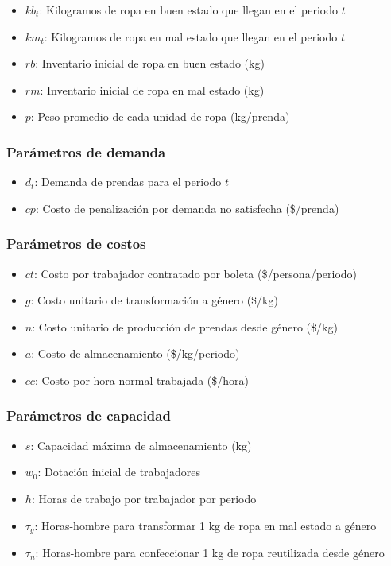 \begin{itemize}
    \item $kb_t$: Kilogramos de ropa en buen estado que llegan en el periodo $t$
    \item $km_t$: Kilogramos de ropa en mal estado que llegan en el periodo $t$
    \item $rb$: Inventario inicial de ropa en buen estado (kg)
    \item $rm$: Inventario inicial de ropa en mal estado (kg)
    \item $p$: Peso promedio de cada unidad de ropa (kg/prenda)
\end{itemize}

\subsubsection*{Parámetros de demanda}

\begin{itemize}
    \item $d_t$: Demanda de prendas para el periodo $t$
    \item $cp$: Costo de penalización por demanda no satisfecha (\$/prenda)
\end{itemize}

\subsubsection*{Parámetros de costos}

\begin{itemize}
    \item $ct$: Costo por trabajador contratado por boleta (\$/persona/periodo)
    \item $g$: Costo unitario de transformación a género (\$/kg)
    \item $n$: Costo unitario de producción de prendas desde género (\$/kg)
    \item $a$: Costo de almacenamiento (\$/kg/periodo)
    \item $cc$: Costo por hora normal trabajada (\$/hora)
\end{itemize}

\subsubsection*{Parámetros de capacidad}

\begin{itemize}
    \item $s$: Capacidad máxima de almacenamiento (kg)
    \item $w_0$: Dotación inicial de trabajadores
    \item $h$: Horas de trabajo por trabajador por periodo
    \item $\tau_g$: Horas-hombre para transformar 1 kg de ropa en mal estado a género
    \item $\tau_n$: Horas-hombre para confeccionar 1 kg de ropa reutilizada desde género
\end{itemize}


